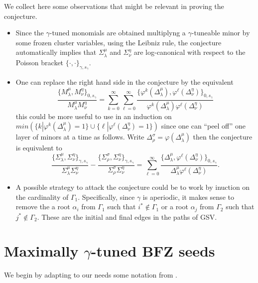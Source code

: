 \documentclass[a4paper]{amsart}
\theoremstyle{definition}
\newcommand{\sayS}[1]{\say[S]{#1}}
\begin{document}
We collect here some observations that might be relevant in proving the conjecture.
\begin{itemize}
  \item
    Since the $\gamma$-tuned monomials are obtained multiplyng a $\gamma$-tuneable minor by some frozen cluster variables, using the Leibniz rule, the conjecture automatically implies that $\Sigma_\lambda^\mu$ and $\Sigma_\nu^\eta$ are log-canonical with respect to the Poisson bracket $\{\cdot,\cdot\}_{\gamma,s_\gamma}$.

 \item
   One can replace the right hand side in the conjecture by the equivalent
   \[
     \frac{\{M_\lambda^\mu,M_\nu^\eta\}_{0,s_\gamma}}{M_\lambda^\mu M_\nu^\eta}
     =
     \sum_{k=0}^\infty\sum_{\ell=0}^\infty \frac{\{\varphi^k(\Delta_\lambda^\mu),\varphi^\ell(\Delta_\nu^\eta)\}_{0,s_\gamma}}{\varphi^k(\Delta_\lambda^\mu)\varphi^\ell(\Delta_\nu^\eta)}
   \]
   this could be more useful to use in an induction on $min(\{k | \varphi^k(\Delta_\lambda^\mu)=1\}\cup \{\ell | \varphi^\ell(\Delta_\nu^\eta)=1\} )$ since one can ``peel off'' one layer of minors at a time as follows.
   Write $\Delta_\rho^\sigma = \varphi(\Delta_\lambda^\mu)$ then the conjecture is equivalent to
   \[
     \frac{\{\Sigma_\lambda^\mu,\Sigma_\nu^\eta\}_{\gamma,s_\gamma}}{\Sigma_\lambda^\mu \Sigma_\nu^\eta}
     -
     \frac{\{\Sigma_\rho^\sigma,\Sigma_\nu^\eta\}_{\gamma,s_\gamma}}{\Sigma_\rho^\sigma \Sigma_\nu^\eta}
     =
     \sum_{\ell=0}^\infty \frac{\{\Delta_\lambda^\mu,\varphi^\ell(\Delta_\nu^\eta)\}_{0,s_\gamma}}{\Delta_\lambda^\mu\varphi^\ell(\Delta_\nu^\eta)}
     .
   \]

 \item
   A possible strategy to attack the conjecture could be to work by inuction on the cardinality of $\Gamma_1$. 
   Specifically, since $\gamma$ is aperiodic, it makes sense to remove the a root $\alpha_i$ from $\Gamma_1$ such that $i^*\not \in \Gamma_1$ or a root $\alpha_j$ from $\Gamma_2$ such that $j^*\not \in \Gamma_2$.
   These are the initial and final edges in the paths of GSV.
   \sayS{Is this right?} 

\end{itemize}

\section{Maximally $\gamma$-tuned BFZ seeds}
We begin by adapting to our needs some notation from \cite{BFZ05}.
\end{document}
